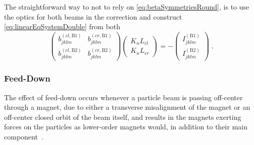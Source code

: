 The straightforward way to not to rely on \cref{eq:betaSymmetriesRound}, 
is to use the optics for both beams in the correction and construct \cref{eq:linearEqSystemDouble} from both
%
\begin{equation}    
    \label{eq:linearEqSystemDoubleOptics}
        \begin{pmatrix}
            b_{jklm}^{(cl, \text{B1})} & b_{jklm}^{(cr, \text{B1})} \\
            b_{jklm}^{(cl, \text{B2})} & b_{jklm}^{(cr, \text{B2})}
        \end{pmatrix}
        \begin{pmatrix}
            K_{n}L_{cl} \\ 
            K_{n}L_{cr}
        \end{pmatrix}
        = - 
        \begin{pmatrix}
            I^{(\text{B1})}_{jklm} \\ 
            I^{(\text{B2})}_{jklm} 
        \end{pmatrix} 
        \; .
\end{equation}

\subsubsection{Feed-Down} %

The effect of feed-down occurs whenever a particle beam is passing off-center through a magnet, 
due to either a transverse misalignment of the magnet or an off-center closed orbit of the beam itself,
and results in the magnets exerting forces on the particles as lower-order magnets would, in addition
to their main component~\cite{WiedemannParticleAcceleratorPhysics2015}. 

